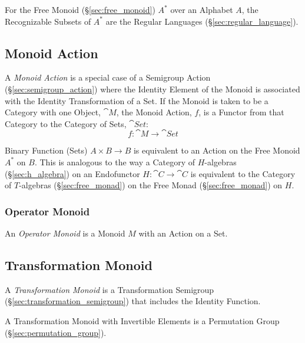For the Free Monoid (\S\ref{sec:free_monoid}) $A^*$ over an Alphabet
$A$, the Recognizable Subsets of $A^*$ are the Regular Languages
(\S\ref{sec:regular_language}).



\subsection{Monoid Action}\label{sec:monoid_action}

A \emph{Monoid Action} is a special case of a Semigroup Action
(\S\ref{sec:semigroup_action}) where the Identity Element of the
Monoid is associated with the Identity Transformation of a Set. If the
Monoid is taken to be a Category with one Object, $\cat{M}$, the
Monoid Action, $f$, is a Functor from that Category to the Category of
Sets, $\cat{Set}$:
\[
  f : \cat{M} \rightarrow \cat{Set}
\]

Binary Function (Sets) $A \times B \rightarrow B$ is equivalent to an
Action on the Free Monoid $A^*$ on $B$. This is analogous to the way a
Category of $H$-algebras (\S\ref{sec:h_algebra}) on an Endofunctor $H
: \cat{C} \rightarrow \cat{C}$ is equivalent to the Category of
$T$-algebras (\S\ref{sec:free_monad}) on the Free Monad
(\S\ref{sec:free_monad}) on $H$.



\subsubsection{Operator Monoid}\label{sec:operator_monoid}

An \emph{Operator Monoid} is a Monoid $M$ with an Action on a Set.



\subsection{Transformation Monoid}\label{sec:transformation_monoid}

A \emph{Transformation Monoid} is a Transformation Semigroup
(\S\ref{sec:transformation_semigroup}) that includes the Identity
Function.

A Transformation Monoid with Invertible Elements is a Permutation
Group (\S\ref{sec:permutation_group}).

